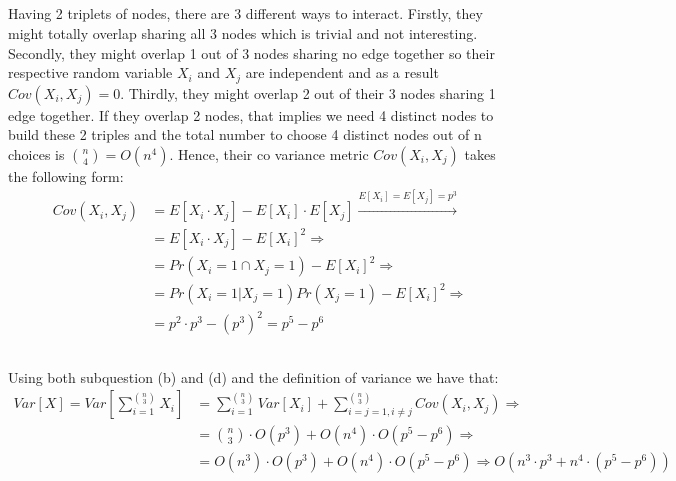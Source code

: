 \documentclass[11pt]{537homework}
\begin{document}
\subsection{}
Having 2 triplets of nodes, there are 3 different ways to interact. Firstly, they might totally overlap sharing all 3 nodes which is trivial and not interesting. Secondly, they might overlap 1 out of 3 nodes sharing no edge together so their respective random variable $X_i$ and $X_j$ are independent and as a result $Cov(X_i,X_j) = 0$. Thirdly, they might overlap 2 out of their 3 nodes sharing 1 edge together. If they overlap 2 nodes, that implies we need 4 distinct nodes to build these 2 triples and the total number to choose 4 distinct nodes out of n choices is ${n \choose 4} = O(n^4)$. Hence, their co variance metric $Cov(X_i,X_j)$ takes the following form:
\begin{align*}
    Cov(X_i,X_j) &= E[X_i \cdot X_j] - E[X_i] \cdot E[X_j] \xrightarrow{E[X_i] = E[X_j] = p^3} \\
                 &= E[X_i \cdot X_j] - E[X_i]^2 \Longrightarrow \\
                 &= Pr(X_i = 1 \cap X_j = 1) - E[X_i]^2 \Longrightarrow \\
                 &= Pr(X_i = 1 | X_j = 1)Pr(X_j = 1) - E[X_i]^2 \Longrightarrow \\
                 &= p^2 \cdot p^3 - (p^3)^2 = p^5 - p^6
\end{align*}
\subsection{} 
Using both subquestion (b) and (d) and the definition of variance we have that:
\begin{align*}
    Var[X] = Var[\sum_{i=1}^{n \choose 3} X_i] &= \sum_{i=1}^{n \choose 3} Var[X_i] + \sum_{i=j=1,i \neq j}^{n \choose 3} Cov(X_i,X_j) \Longrightarrow \\
    &= {n \choose 3} \cdot O(p^3)  + O(n^4) \cdot O(p^5 - p^6) \Longrightarrow \\
    &= O(n^3) \cdot O(p^3)  + O(n^4) \cdot O(p^5 - p^6) \Longrightarrow O(n^3 \cdot p^3 + n^4 \cdot (p^5 - p^6))
\end{align*}
\end{document}
